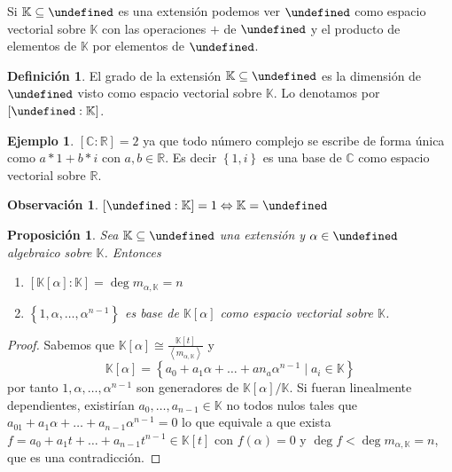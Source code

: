 \documentclass[10pt, spanish]{report}
\newtheorem*{prop}{Proposición}
\theoremstyle{definition}
\newtheorem*{defin}{Definición}
\newtheorem*{ej}{Ejemplo}
\newtheorem*{obs}{Observación}
\newcommand{\R}{\mathbb{R}}
\newcommand{\C}{\mathbb{C}}
\newcommand{\K}{\mathbb{K}}
\let\L\undefined
\newcommand{\L}{\mathbb{L}}
\newcommand{\completar}{\fbox{\textbf{¡Completar!}}}
\begin{document}
Si $\K\subseteq\L$ es una extensión podemos ver $\L$ como espacio vectorial
sobre $\K$ con las operaciones $+$ de $\L$ y el producto de elementos de $\K$
por elementos de $\L$.

\begin{defin}
    El grado de la extensión $\K\subseteq\L$ es la dimensión de $\L$ visto como
    espacio vectorial sobre $\K$. Lo denotamos por $\left[\L:\K\right]$.
\end{defin}

\begin{ej}
    $[\C:\R]=2$ ya que todo número complejo se escribe de forma única como
    $a*1+b*i$ con $a,b\in \R$. Es decir $\left\{ 1,i \right\}$ es una base de
    $\C$ como espacio vectorial sobre $\R$.
\end{ej}

\begin{obs}
    $[\L:\K]=1 \Leftrightarrow\K=\L$
    \completar
\end{obs}

\begin{prop}
    Sea $\K\subseteq\L$ una extensión y $\alpha\in\L$ algebraico sobre $\K$.
    Entonces
    \begin{enumerate}
        \item $[\K[\alpha]:\K]=\deg{m_{\alpha,\K}}=n$
        \item $\left\{ 1,\alpha,\ldots,\alpha^{n-1} \right\} $ es base de $\K[\alpha]$ como espacio vectorial sobre $\K$.
    \end{enumerate}
\end{prop}

\begin{proof}
    Sabemos que $\K[\alpha]\cong \frac{\K[t]}{\left< m_{\alpha,\K} \right> }$ y
    \[\K[\alpha]=\left\{a_0+a_1\alpha+\ldots+a{n_a}\alpha^{n-1}\mid a_i\in\K\right\}\]
    por tanto $1,\alpha,\ldots,\alpha^{n-1}$ son generadores de $\K[\alpha]/\K$.
    Si fueran linealmente dependientes, existirían $a_0,\ldots,a_{n-1}\in\K$ no
    todos nulos tales que $a_01+a_1\alpha+\ldots+a_{n-1}\alpha^{n-1}=0$ lo que
    equivale a que exista $f=a_0+a_1t+\ldots+a_{n-1}t^{n-1}\in \K[t]$ con
    $f(\alpha)=0$ y $\deg{f}<\deg{m_{\alpha,\K}}=n$, que es una contradicción.
\end{proof}
\end{document}
